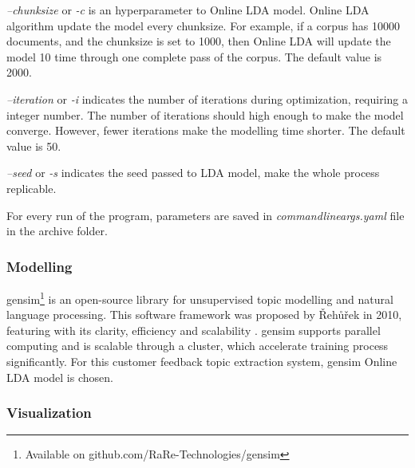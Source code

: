 \documentclass{article} %
\begin{document}
\textit{--chunksize} or \textit{-c} is an hyperparameter to Online LDA model. Online LDA algorithm update the model every chunksize. For example, if a corpus has 10000 documents, and the chunksize is set to 1000, then Online LDA will update the model 10 time through one complete pass of the corpus. The default value is 2000.

\textit{--iteration} or \textit{-i} indicates the number of iterations during optimization, requiring a integer number. The number of iterations should high enough to make the model converge. However, fewer iterations make the modelling time shorter. The default value is 50.

\textit{--seed} or \textit{-s} indicates the seed passed to LDA model, make the whole process replicable.

For every run of the program, parameters are saved in \textit{commandline\textunderscore{}args.yaml} file in the archive folder.

\subsubsection{Modelling}
gensim\footnote{Available on github.com/RaRe-Technologies/gensim} is an open-source library for unsupervised topic modelling and natural language processing. This software framework was proposed by {\v R}eh{\r u}{\v r}ek in 2010, featuring with its clarity, efficiency and scalability \cite{rehurek_lrec}. gensim supports parallel computing and is scalable through a cluster, which accelerate training process significantly. For this customer feedback topic extraction system, gensim Online LDA model is chosen. 

\subsubsection{Visualization}
\end{document}

